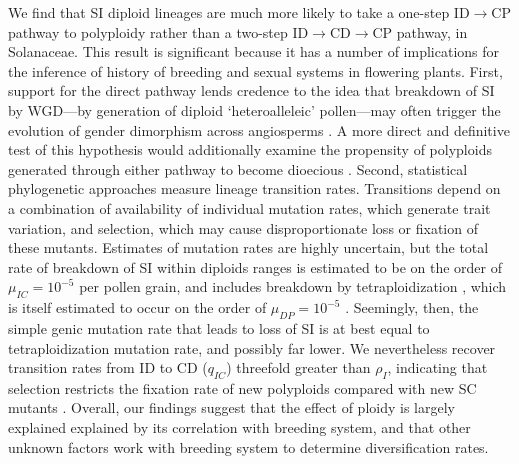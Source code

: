 We find that SI diploid lineages are much more likely to take a one-step  ID$\rightarrow$CP pathway to polyploidy rather than a two-step ID$\rightarrow$CD$\rightarrow$CP pathway, in Solanaceae.
This result is significant because it has a number of implications for the inference of history of breeding and sexual systems in flowering plants.
First, support for the direct pathway lends credence to the idea that breakdown of SI by WGD---by generation of diploid `heteroalleleic' pollen---may often trigger the evolution of gender dimorphism across angiosperms \citep{miller_2000}.
A more direct and definitive test of this hypothesis would additionally examine the propensity of polyploids generated through either pathway to become dioecious \citep{robertson_2011}.
Second, statistical phylogenetic approaches measure lineage transition rates.
Transitions depend on a combination of availability of individual mutation rates, which generate trait variation, and selection, which may cause disproportionate loss or fixation of these mutants.
Estimates of mutation rates are highly uncertain, but the total rate of breakdown of SI within diploids ranges is estimated to be on the order of  $\mu_{IC} = 10^{-5}$ per pollen grain, and includes breakdown by tetraploidization \citep{lewis1979}, which is itself estimated to occur on the order of $\mu_{DP} = 10^{-5}$ \citep{ramsey_1998}. 
Seemingly, then, the simple genic mutation rate that leads to loss of SI is at best equal to tetraploidization mutation rate, and possibly far lower.
We nevertheless recover transition rates from ID to CD ($q_{IC}$) threefold greater than $\rho_{I}$, indicating that selection restricts the fixation rate of new polyploids compared with new SC mutants \citep{robertson_2011}.
Overall, our findings suggest that the effect of ploidy is largely explained explained by its correlation with breeding system, and that other unknown factors work with breeding system to determine diversification rates.

